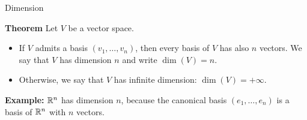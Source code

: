 \documentclass{beamer}
\begin{document}
\begin{frame}[t]{Dimension}
	\begin{block}{\bf Theorem}
	Let $V$ be a vector space.
	\begin{itemize}
		\item If $V$ admits a basis $(v_1, \dots, v_n)$, then every basis of $V$ has also $n$ vectors. We say that $V$ has dimension $n$ and write $\dim(V) = n$.
		\item Otherwise, we say that $V$ has infinite dimension: $\dim(V) = +\infty$.
	\end{itemize}
	\end{block}
	\textbf{Example:} $\mathbb{R}^n$ has dimension $n$, because the canonical basis $(e_1,\dots, e_n)$ is a basis of $\mathbb{R}^n$ with $n$ vectors.
\end{frame}


\end{document}
